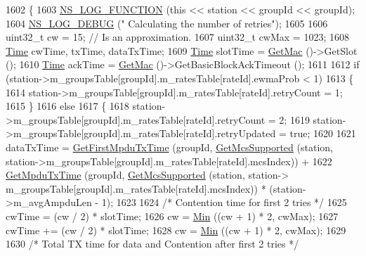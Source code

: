 \begin{DoxyCode}
1602 \{
1603   \hyperlink{log-macros-disabled_8h_a90b90d5bad1f39cb1b64923ea94c0761}{NS\_LOG\_FUNCTION} (\textcolor{keyword}{this} << station << groupId << groupId);
1604   \hyperlink{group__logging_ga413f1886406d49f59a6a0a89b77b4d0a}{NS\_LOG\_DEBUG} (\textcolor{stringliteral}{" Calculating the number of retries"});
1605 
1606   uint32\_t cw = 15;                     \textcolor{comment}{// Is an approximation.}
1607   uint32\_t cwMax = 1023;
1608   \hyperlink{namespacens3_1_1TracedValueCallback_a7ffd3e7c142ffe7c8a1d2db9b8de38ec}{Time} cwTime, txTime, dataTxTime;
1609   \hyperlink{namespacens3_1_1TracedValueCallback_a7ffd3e7c142ffe7c8a1d2db9b8de38ec}{Time} slotTime = \hyperlink{classns3_1_1WifiRemoteStationManager_a1739d7dbfba0b5d9539ba840426dfb78}{GetMac} ()->GetSlot ();
1610   \hyperlink{namespacens3_1_1TracedValueCallback_a7ffd3e7c142ffe7c8a1d2db9b8de38ec}{Time} ackTime = \hyperlink{classns3_1_1WifiRemoteStationManager_a1739d7dbfba0b5d9539ba840426dfb78}{GetMac} ()->GetBasicBlockAckTimeout ();
1611 
1612   \textcolor{keywordflow}{if} (station->m\_groupsTable[groupId].m\_ratesTable[rateId].ewmaProb < 1)
1613     \{
1614       station->m\_groupsTable[groupId].m\_ratesTable[rateId].retryCount = 1;
1615     \}
1616   \textcolor{keywordflow}{else}
1617     \{
1618       station->m\_groupsTable[groupId].m\_ratesTable[rateId].retryCount = 2;
1619       station->m\_groupsTable[groupId].m\_ratesTable[rateId].retryUpdated = \textcolor{keyword}{true};
1620 
1621       dataTxTime = \hyperlink{classns3_1_1MinstrelHtWifiManager_a53308ad39a550d0972aad572b3566ec5}{GetFirstMpduTxTime} (groupId, 
      \hyperlink{classns3_1_1WifiRemoteStationManager_af21ecff608cea2837c1af9385bbe6e4e}{GetMcsSupported} (station, station->m\_groupsTable[groupId].m\_ratesTable[rateId].mcsIndex)) +
1622         \hyperlink{classns3_1_1MinstrelHtWifiManager_a10e963727034a88092842510c5fc21bc}{GetMpduTxTime} (groupId, \hyperlink{classns3_1_1WifiRemoteStationManager_af21ecff608cea2837c1af9385bbe6e4e}{GetMcsSupported} (station, station->
      m\_groupsTable[groupId].m\_ratesTable[rateId].mcsIndex)) * (station->m\_avgAmpduLen - 1);
1623 
1624       \textcolor{comment}{/* Contention time for first 2 tries */}
1625       cwTime = (cw / 2) * slotTime;
1626       cw = \hyperlink{group__highprec_gacb0b89d5f4363bf77747ff1212f27430}{Min} ((cw + 1) * 2, cwMax);
1627       cwTime += (cw / 2) * slotTime;
1628       cw = \hyperlink{group__highprec_gacb0b89d5f4363bf77747ff1212f27430}{Min} ((cw + 1) * 2, cwMax);
1629 
1630       \textcolor{comment}{/* Total TX time for data and Contention after first 2 tries */}

\end{DoxyCode}
